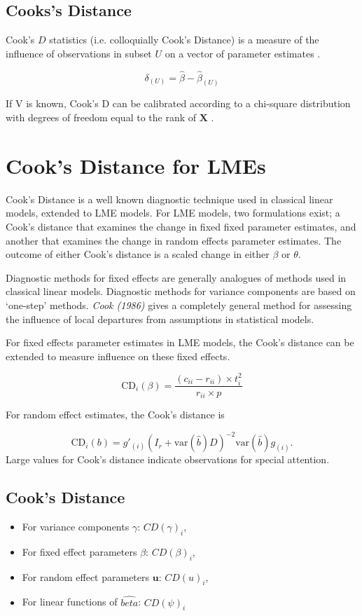 \documentclass[12pt, a4paper]{article}
\begin{document}
\subsection{Cooks's Distance}%
 Cook's $D$ statistics (i.e. colloquially Cook's Distance) is a measure of the influence of observations in subset $U$ on a vector of parameter estimates \citep{cook77}.

\[ \delta_{(U)} = \hat{\beta} - \hat{\beta}_{(U)}\]

If V is known, Cook's D can be calibrated according to a chi-square distribution with degrees of freedom equal to the rank of $\boldsymbol{X}$ \citep{cpj92}.	




\section{Cook's Distance for LMEs} %


Cook's Distance is a well known diagnostic technique used in classical linear models, extended to LME models.  For LME models, two formulations exist; a Cook's distance that examines the change in fixed fixed parameter estimates, and another that examines the change in random effects parameter estimates. The outcome of either Cook's distance is a scaled change in either $\beta$ or $\theta$.



Diagnostic methods for fixed effects are generally analogues of methods used in classical linear models.
Diagnostic methods for variance components are based on `one-step' methods.
\textit{Cook (1986)} gives a completely general method for assessing the influence of local departures from assumptions in statistical models.

For fixed effects parameter estimates in LME models, the  Cook's distance can be extended to measure influence on these fixed effects.

\[
\mbox{CD}_{i}(\beta) = \frac{(c_{ii} - r_{ii}) \times t^2_{i}}{r_{ii} \times p}
\]

For random effect estimates, the  Cook's distance is

\[
\mbox{CD}_{i}(b) = g{\prime}_{(i)} (I_{r} + \mbox{var}(\hat{b})D)^{-2}\mbox{var}(\hat{b})g_{(i)}.
\]
Large values for Cook's distance indicate observations for special attention.

\subsection{Cook's Distance}
\begin{itemize}
	\item For variance components $\gamma$: $CD(\gamma)_i$,
	\item For fixed effect parameters $\beta$: $CD(\beta)_i$,
	\item For random effect parameters $\boldsymbol{u}$: $CD(u)_i$,
	\item For linear functions of $\hat{beta}$: $CD(\psi)_i$
\end{itemize}
\end{document}
